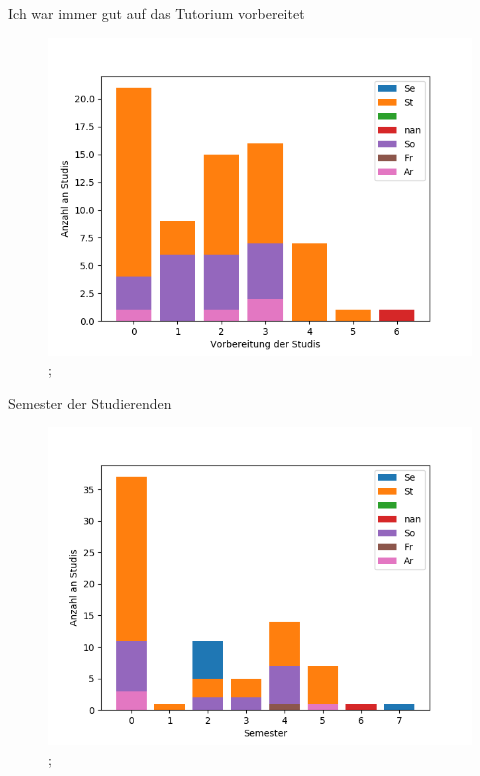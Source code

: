 \documentclass[10pt]{beamer}
\begin{document}
\begin{frame}[fragile]{Ich war immer gut auf das Tutorium vorbereitet} 
 \begin{figure}
 \includegraphics[width= 0.9\linewidth]{./PDFcreater/Plots/SolidEdge/Ich+war+immer+gut+auf+das+Tutorium+vorbereitet.png};
 \end{figure}
 \end{frame}
\begin{frame}[fragile]{Semester der Studierenden} 
 \begin{figure}
 \includegraphics[width= 0.9\linewidth]{./PDFcreater/Plots/SolidEdge/Semester+der+Studierenden.png};
 \end{figure}
 \end{frame}
\end{document}
